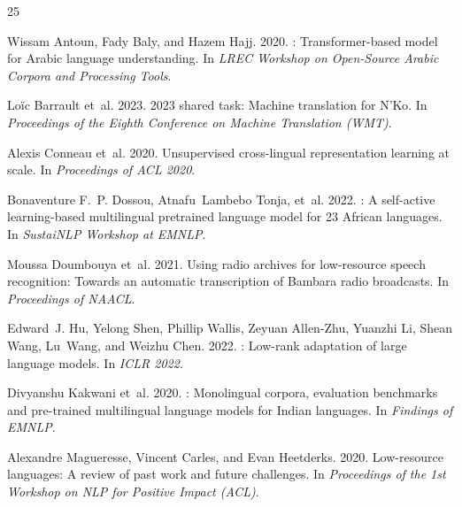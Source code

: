 \documentclass[11pt]{article}
\begin{document}
\begin{thebibliography}{25}
\providecommand{\natexlab}[1]{#1}

Wissam Antoun, Fady Baly, and Hazem Hajj. 2020.
: Transformer-based model for {Arabic} language understanding.
\newblock In \emph{LREC Workshop on Open-Source Arabic Corpora and Processing Tools}.

Lo\"{i}c Barrault et~al. 2023.
 2023 shared task: Machine translation for {N'Ko}.
\newblock In \emph{Proceedings of the Eighth Conference on Machine Translation (WMT)}.

Alexis Conneau et~al. 2020.
\newblock Unsupervised cross-lingual representation learning at scale.
\newblock In \emph{Proceedings of ACL 2020}.

Bonaventure F.~P. Dossou, Atnafu~Lambebo Tonja, et~al. 2022.
: A self-active learning-based multilingual pretrained language model for 23 {African} languages.
\newblock In \emph{SustaiNLP Workshop at EMNLP}.

Moussa Doumbouya et~al. 2021.
\newblock Using radio archives for low-resource speech recognition: Towards an automatic transcription of {Bambara} radio broadcasts.
\newblock In \emph{Proceedings of NAACL}.

Edward~J. Hu, Yelong Shen, Phillip Wallis, Zeyuan Allen-Zhu, Yuanzhi Li, Shean Wang, Lu~Wang, and Weizhu Chen. 2022.
: Low-rank adaptation of large language models.
\newblock In \emph{ICLR 2022}.

Divyanshu Kakwani et~al. 2020.
: Monolingual corpora, evaluation benchmarks and pre-trained multilingual language models for {Indian} languages.
\newblock In \emph{Findings of EMNLP}.

Alexandre Magueresse, Vincent Carles, and Evan Heetderks. 2020.
\newblock Low-resource languages: A review of past work and future challenges.
\newblock In \emph{Proceedings of the 1st Workshop on NLP for Positive Impact (ACL)}.


\end{thebibliography}
\end{document}
